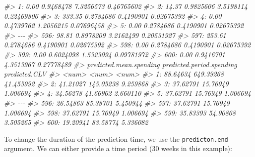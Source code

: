 \documentclass[
]{article}
\newenvironment{Shaded}{\begin{snugshade}}{\end{snugshade}}
\newcommand{\CommentTok}[1]{\textcolor[rgb]{0.56,0.35,0.01}{\textit{#1}}}
\begin{document}
\begin{Shaded}
\begin{Highlighting}[]
\CommentTok{\#\textgreater{}   1:                   0.00 0.9468478 7.3256573 0.46765602}
\CommentTok{\#\textgreater{}   2:                  14.37 0.9825606 3.5198114 0.22469806}
\CommentTok{\#\textgreater{}   3:                 333.35 0.2784686 0.4190901 0.02675392}
\CommentTok{\#\textgreater{}   4:                   0.00 0.4739762 1.2056215 0.07696458}
\CommentTok{\#\textgreater{}   5:                   0.00 0.2784686 0.4190901 0.02675392}
\CommentTok{\#\textgreater{}  {-}{-}{-}                                                      }
\CommentTok{\#\textgreater{} 596:                  98.81 0.8978209 3.2162499 0.20531927}
\CommentTok{\#\textgreater{} 597:                 253.61 0.2784686 0.4190901 0.02675392}
\CommentTok{\#\textgreater{} 598:                   0.00 0.2784686 0.4190901 0.02675392}
\CommentTok{\#\textgreater{} 599:                   0.00 0.6024098 1.5323094 0.09781972}
\CommentTok{\#\textgreater{} 600:                   0.00 0.9416701 4.3513967 0.27778489}
\CommentTok{\#\textgreater{}      predicted.mean.spending predicted.period.spending predicted.CLV}
\CommentTok{\#\textgreater{}                        \textless{}num\textgreater{}                     \textless{}num\textgreater{}         \textless{}num\textgreater{}}
\CommentTok{\#\textgreater{}   1:                88.64634                 649.39268     41.455992}
\CommentTok{\#\textgreater{}   2:                41.21027                 145.05238      9.259868}
\CommentTok{\#\textgreater{}   3:                37.62791                  15.76949      1.006694}
\CommentTok{\#\textgreater{}   4:                34.56278                  41.66962      2.660110}
\CommentTok{\#\textgreater{}   5:                37.62791                  15.76949      1.006694}
\CommentTok{\#\textgreater{}  {-}{-}{-}                                                                }
\CommentTok{\#\textgreater{} 596:                26.54863                  85.38701      5.450944}
\CommentTok{\#\textgreater{} 597:                37.62791                  15.76949      1.006694}
\CommentTok{\#\textgreater{} 598:                37.62791                  15.76949      1.006694}
\CommentTok{\#\textgreater{} 599:                35.83393                  54.90868      3.505265}
\CommentTok{\#\textgreater{} 600:                19.20941                  83.58774      5.336082}
\end{Highlighting}
\end{Shaded}

To change the duration of the prediction time, we use the
\texttt{predicton.end} argument. We can either provide a time period (30
weeks in this example):
\end{document}
